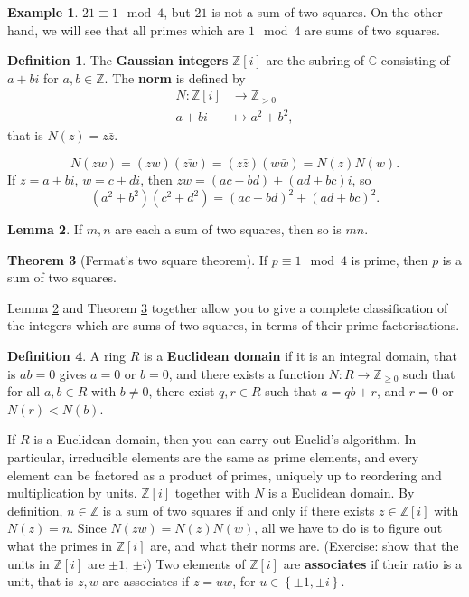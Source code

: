 \documentclass{article}
\newcommand{\Z}{\mathbb{Z}}
\newcommand{\C}{\mathbb{C}}
\newcommand{\rb}[1]{\left( #1 \right)}
\renewcommand{\sb}[1]{\left[ #1 \right]}
\newcommand{\cb}[1]{\left\{ #1 \right\}}
\theoremstyle{definition}\newtheorem{definition}{Definition}
\theoremstyle{definition}\newtheorem{remark}[definition]{Remark}
\theoremstyle{definition}\newtheorem*{example}{Example}
\theoremstyle{definition}\newtheorem*{note}{Note}
\newtheorem{lemma}[definition]{Lemma}
\newtheorem{theorem}[definition]{Theorem}
\begin{document}
\begin{example}
$ 21 \equiv 1 \mod 4 $, but $ 21 $ is not a sum of two squares. On the other hand, we will see that all primes which are $ 1 \mod 4 $ are sums of two squares.
\end{example}

\begin{definition}
The \textbf{Gaussian integers} $ \Z\sb{i} $ are the subring of $ \C $ consisting of $ a + bi $ for $ a, b \in \Z $. The \textbf{norm} is defined by
\begin{align*}
N : \Z\sb{i} & \to \Z_{> 0} \\
a + bi & \mapsto a^2 + b^2,
\end{align*}
that is $ N\rb{z} = z\bar{z} $.
\end{definition}

$$ N\rb{zw} = \rb{zw}\rb{\bar{zw}} = \rb{z\bar{z}}\rb{w\bar{w}} = N\rb{z}N\rb{w}. $$
If $ z = a + bi $, $ w = c + di $, then $ zw = \rb{ac - bd} + \rb{ad + bc}i $, so
$$ \rb{a^2 + b^2}\rb{c^2 + d^2} = \rb{ac - bd}^2 + \rb{ad + bc}^2. $$

\begin{lemma}
\label{lem:46}
If $ m, n $ are each a sum of two squares, then so is $ mn $.
\end{lemma}

\begin{theorem}[Fermat's two square theorem]
\label{thm:47}
If $ p \equiv 1 \mod 4 $ is prime, then $ p $ is a sum of two squares.
\end{theorem}

Lemma \ref{lem:46} and Theorem \ref{thm:47} together allow you to give a complete classification of the integers which are sums of two squares, in terms of their prime factorisations.

\begin{definition}
A ring $ R $ is a \textbf{Euclidean domain} if it is an integral domain, that is $ ab = 0 $ gives $ a = 0 $ or $ b = 0 $, and there exists a function $ N : R \to \Z_{\ge 0} $ such that for all $ a, b \in R $ with $ b \ne 0 $, there exist $ q, r \in R $ such that $ a = qb + r $, and $ r = 0 $ or $ N\rb{r} < N\rb{b} $.
\end{definition}

If $ R $ is a Euclidean domain, then you can carry out Euclid's algorithm. In particular, irreducible elements are the same as prime elements, and every element can be factored as a product of primes, uniquely up to reordering and multiplication by units. $ \Z\sb{i} $ together with $ N $ is a Euclidean domain. By definition, $ n \in \Z $ is a sum of two squares if and only if there exists $ z \in \Z\sb{i} $ with $ N\rb{z} = n $. Since $ N\rb{zw} = N\rb{z}N\rb{w} $, all we have to do is to figure out what the primes in $ \Z\sb{i} $ are, and what their norms are. (Exercise: show that the units in $ \Z\sb{i} $ are $ \pm 1 $, $ \pm i $) Two elements of $ \Z\sb{i} $ are \textbf{associates} if their ratio is a unit, that is $ z, w $ are associates if $ z = uw $, for $ u \in \cb{\pm 1, \pm i} $.
\end{document}
